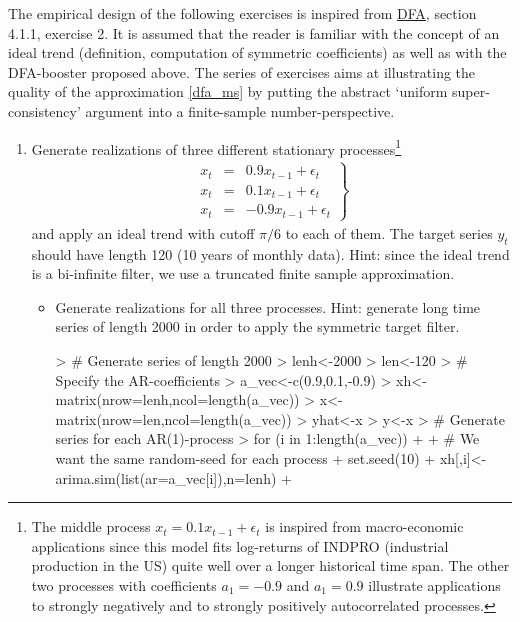 \documentclass[a4paper]{book}
\begin{document}
The empirical design of the following exercises is inspired from \href{http://blog.zhaw.ch/sef/files/2014/10/DFA.pdf}{DFA}, section 4.1.1, exercise 2. It is assumed that the reader is familiar with the concept of an ideal trend (definition, computation of symmetric coefficients) as well as with the DFA-booster proposed above. The series of exercises aims at illustrating the quality of the approximation  \ref{dfa_ms} by putting the abstract `uniform super-consistency' argument into a finite-sample number-perspective. 
\begin{enumerate}
\item Generate realizations of three different stationary processes\footnote{The middle process $x_t=0.1x_{t-1}+\epsilon_t$ is inspired from macro-economic applications since this model fits log-returns of INDPRO (industrial production in the US) quite well over a longer historical time span. The other two processes with coefficients $a_1=-0.9$ and $a_1=0.9$ illustrate applications to strongly negatively and to strongly positively autocorrelated processes.}
\begin{eqnarray}
\left.\begin{array}{ccc}x_t&=&0.9x_{t-1}+\epsilon_t\\
x_t&=&0.1x_{t-1}+\epsilon_t\\
x_t&=&-0.9x_{t-1}+\epsilon_t
\end{array}\right\}\label{ar1_processes}
\end{eqnarray}
and apply an ideal trend with cutoff $\pi/6$ to each of them. The target series $y_t$ should have length 120 (10 years of monthly data). Hint: since the ideal trend is a bi-infinite filter, we use a truncated finite sample approximation.  
\begin{itemize}
\item Generate realizations for all three processes. Hint: generate long time series of length 2000 in order to apply the symmetric target filter. 
\begin{Schunk}
\begin{Sinput}
> # Generate series of length 2000
> lenh<-2000
> len<-120
> # Specify the AR-coefficients
> a_vec<-c(0.9,0.1,-0.9)
> xh<-matrix(nrow=lenh,ncol=length(a_vec))
> x<-matrix(nrow=len,ncol=length(a_vec))
> yhat<-x
> y<-x
> # Generate series for each AR(1)-process
> for (i in 1:length(a_vec))
+ {
+ # We want the same random-seed for each process  
+   set.seed(10)
+   xh[,i]<-arima.sim(list(ar=a_vec[i]),n=lenh)
+ }
\end{Sinput}
\end{Schunk}


\end{itemize}
\end{enumerate}
\end{document}
